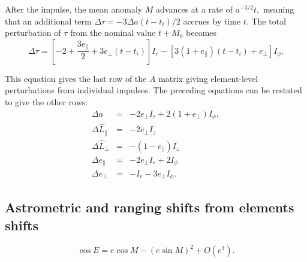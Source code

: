 \documentclass[linenumbers, onecolumn]{aastex631}
\newcommand{\matA}{A}
\newcommand{\Lhat}{\hat L}
\begin{document}
After the impulse, the mean anomaly $M$ advances at a rate of $a^{-3/2}t,$ meaning that an additional term $\Delta\tau = -3\Delta a (t-t_i)/2$ accrues by time $t$. The total perturbation of $\tau$ from the nominal value $t+M_0$ becomes
\begin{equation}
  \Delta\tau= \left[-2+\frac{3e_\parallel}{2} +3 e_\perp (t-t_i)\right] I_r  - \left[3(1+e_\parallel)(t-t_i) + e_\perp\right] I_\phi.
  \label{eq:dtau}
\end{equation}

This equation gives the last row of the $\matA$ matrix giving element-level perturbations from individual impulses.  The preceding equations can be restated to give the other rows:
\begin{eqnarray}
  \Delta a & = & -2e_\perp I_r + 2(1+e_\perp) I_\phi, \\
  \Delta \Lhat_\parallel & = & -2e_\perp I_z \\
  \Delta \Lhat_\perp & = & -(1-e_\parallel) I_z \\
  \Delta e_\parallel & = &  -2e_\perp I_r + 2 I_\phi \\
  \Delta e_\perp & = & -I_r - 3e_\perp I_\phi.
\end{eqnarray}

\subsection{Astrometric and ranging shifts from elements shifts}
\label{sec:observe}
\begin{equation}
  \label{eq:Ee2}
  \cos E  =  e\cos M - (e \sin M)^2 + O(e^3).
\end{equation}
\end{document}
